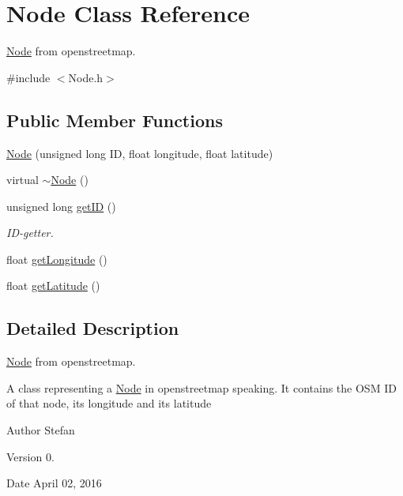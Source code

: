 \hypertarget{classNode}{\section{Node Class Reference}
\label{classNode}
}


\hyperlink{classNode}{Node} from openstreetmap.  




{\ttfamily \#include $<$Node.\+h$>$}

\subsection*{Public Member Functions}
\begin{DoxyCompactItemize}
\item 
\hyperlink{classNode_aa05b9dee7504eb498c92b42a3b7b4feb}{Node} (unsigned long I\+D, float longitude, float latitude)
\item 
virtual \hyperlink{classNode_aa0840c3cb5c7159be6d992adecd2097c}{$\sim$\+Node} ()
\item 
unsigned long \hyperlink{classNode_a0557c98e510afe0964734b397f2fcd2a}{get\+I\+D} ()
\begin{DoxyCompactList}\small\item\em I\+D-\/getter. \end{DoxyCompactList}\item 
float \hyperlink{classNode_ad6be1e5333414b24f7c3ce59a64b5112}{get\+Longitude} ()
\item 
float \hyperlink{classNode_aa6baaf1097d6196c4cac5f3337adfc7f}{get\+Latitude} ()
\end{DoxyCompactItemize}


\subsection{Detailed Description}
\hyperlink{classNode}{Node} from openstreetmap. 

A class representing a \hyperlink{classNode}{Node} in openstreetmap speaking. It contains the O\+S\+M I\+D of that node, its longitude and its latitude

\begin{DoxyAuthor}{Author}
Stefan 
\end{DoxyAuthor}
\begin{DoxyVersion}{Version}
0. 
\end{DoxyVersion}
\begin{DoxyDate}{Date}
April 02, 2016 
\end{DoxyDate}


